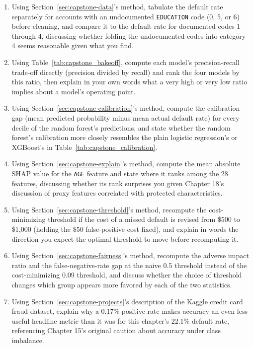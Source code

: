 \documentclass[../ai_in_finance]{subfiles}
\begin{document}
\begin{enumerate}
    \item Using Section~\ref{sec:capstone-data}'s method, tabulate the default rate separately for accounts with an undocumented \texttt{EDUCATION} code (0, 5, or 6) before cleaning, and compare it to the default rate for documented codes 1 through 4, discussing whether folding the undocumented codes into category 4 seems reasonable given what you find.
    \item Using Table~\ref{tab:capstone_bakeoff}, compute each model's precision-recall trade-off directly (precision divided by recall) and rank the four models by this ratio, then explain in your own words what a very high or very low ratio implies about a model's operating point.
    \item Using Section~\ref{sec:capstone-calibration}'s method, compute the calibration gap (mean predicted probability minus mean actual default rate) for every decile of the random forest's predictions, and state whether the random forest's calibration more closely resembles the plain logistic regression's or XGBoost's in Table~\ref{tab:capstone_calibration}.
    \item Using Section~\ref{sec:capstone-explain}'s method, compute the mean absolute SHAP value for the \texttt{AGE} feature and state where it ranks among the 28 features, discussing whether its rank surprises you given Chapter 18's discussion of proxy features correlated with protected characteristics.
    \item Using Section~\ref{sec:capstone-threshold}'s method, recompute the cost-minimizing threshold if the cost of a missed default is revised from \$500 to \$1{,}000 (holding the \$50 false-positive cost fixed), and explain in words the direction you expect the optimal threshold to move before recomputing it.
    \item Using Section~\ref{sec:capstone-fairness}'s method, recompute the adverse impact ratio and the false-negative-rate gap at the naive 0.5 threshold instead of the cost-minimizing 0.09 threshold, and discuss whether the choice of threshold changes which group appears more favored by each of the two statistics.
    \item Using Section~\ref{sec:capstone-projects}'s description of the Kaggle credit card fraud dataset, explain why a 0.17\% positive rate makes accuracy an even less useful headline metric than it was for this chapter's 22.1\% default rate, referencing Chapter 15's original caution about accuracy under class imbalance.

\end{enumerate}
\end{document}
